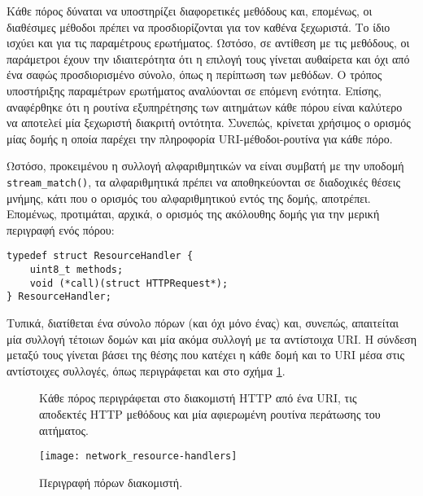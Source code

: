 Κάθε πόρος δύναται να υποστηρίζει διαφορετικές μεθόδους και, επομένως, οι
διαθέσιμες μέθοδοι πρέπει να προσδιορίζονται για τον καθένα ξεχωριστά. Το ίδιο
ισχύει και για τις παραμέτρους ερωτήματος. Ωστόσο, σε αντίθεση με τις μεθόδους,
οι παράμετροι έχουν την ιδιαιτερότητα ότι η επιλογή τους γίνεται αυθαίρετα και
όχι από ένα σαφώς προσδιορισμένο σύνολο, όπως η περίπτωση των μεθόδων. Ο τρόπος
υποστήριξης παραμέτρων ερωτήματος αναλύονται σε επόμενη ενότητα.
Επίσης, αναφέρθηκε ότι η ρουτίνα εξυπηρέτησης των αιτημάτων κάθε πόρου είναι
καλύτερο να αποτελεί μία ξεχωριστή διακριτή οντότητα. Συνεπώς, κρίνεται χρήσιμος
ο ορισμός μίας δομής η οποία παρέχει την πληροφορία URI-μέθοδοι-ρουτίνα για κάθε
πόρο.

Ωστόσο, προκειμένου η συλλογή αλφαριθμητικών να είναι συμβατή με την υποδομή
\verb~stream_match()~, τα αλφαριθμητικά πρέπει να αποθηκεύονται σε διαδοχικές
θέσεις μνήμης, κάτι που ο ορισμός του αλφαριθμητικού εντός της δομής, αποτρέπει.
Επομένως, προτιμάται, αρχικά, ο ορισμός της ακόλουθης δομής για την μερική
περιγραφή ενός πόρου:
\begin{lstlisting}
typedef struct ResourceHandler {
    uint8_t methods;
    void (*call)(struct HTTPRequest*);
} ResourceHandler;
\end{lstlisting}
Τυπικά, διατίθεται ένα σύνολο πόρων (και όχι μόνο ένας) και, συνεπώς, απαιτείται
μία συλλογή τέτοιων δομών και μία ακόμα συλλογή με τα αντίστοιχα URI. Η σύνδεση
μεταξύ τους γίνεται βάσει της θέσης που κατέχει η κάθε δομή και το URI μέσα στις
αντίστοιχες συλλογές, όπως περιγράφεται και στο σχήμα
\ref{fig:network:resource-handlers}.

\begin{figure}
    \caption{Περιγραφή πόρων διακομιστή.
    \label{fig:network:resource-handlers}}
    Κάθε πόρος περιγράφεται στο διακομιστή HTTP από ένα URI, τις αποδεκτές HTTP
    μεθόδους και μία αφιερωμένη ρουτίνα περάτωσης του αιτήματος.
    \begin{center}
    \texttt{[image: network\_resource-handlers]}
    \end{center}
\end{figure}
